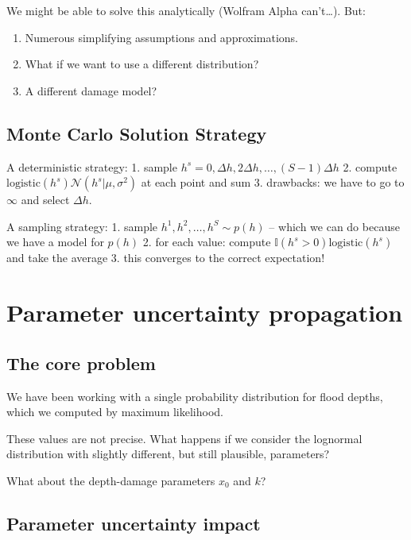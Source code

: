 \documentclass[
  letterpaper,
  DIV=11,
  numbers=noendperiod]{scrreprt}
\providecommand{\tightlist}{%
  \setlength{\itemsep}{0pt}\setlength{\parskip}{0pt}}
\begin{document}
We might be able to solve this analytically (Wolfram Alpha can't\ldots).
But:

\begin{enumerate}
\def\labelenumi{\arabic{enumi}.}
\tightlist
\item
  Numerous simplifying assumptions and approximations.
\item
  What if we want to use a different distribution?
\item
  A different damage model?
\end{enumerate}

\subsection{Monte Carlo Solution
Strategy}\label{monte-carlo-solution-strategy}

A deterministic strategy: 1. sample
\(h^s = 0, \Delta h, 2\Delta h, \ldots, (S-1)\Delta h\) 2. compute
\(\text{logistic}(h^s) \mathcal{N}(h^s | \mu, \sigma^2)\) at each point
and sum 3. drawbacks: we have to go to \(\infty\) and select
\(\Delta h\).

A sampling strategy: 1. sample \(h^1, h^2, \ldots, h^S \sim p(h)\) --
which we can do because we have a model for \(p(h)\) 2. for each value:
compute \(\mathbb{I}(h^s > 0) \text{logistic}(h^s)\) and take the
average 3. this converges to the correct expectation!

\section{Parameter uncertainty
propagation}\label{parameter-uncertainty-propagation}

\subsection{The core problem}\label{the-core-problem}

We have been working with a single probability distribution for flood
depths, which we computed by maximum likelihood.

These values are not precise. What happens if we consider the lognormal
distribution with slightly different, but still plausible, parameters?

What about the depth-damage parameters \(x_0\) and \(k\)?

\subsection{Parameter uncertainty
impact}\label{parameter-uncertainty-impact}
\end{document}
